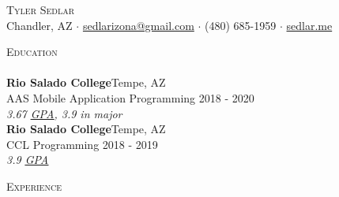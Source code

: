 \documentclass[a4paper]{article}
\newcommand{\lineunder} {
    \vspace*{-8pt} \\
    \hspace*{-18pt} \hrulefill \\
}
\newcommand{\header} [1] {
    {\hspace*{-18pt}\vspace*{6pt} \textsc{#1}}
    \vspace*{-6pt} \lineunder
}
\begin{document}
\vspace*{-40pt}
\setul{}{0.25pt}

\vspace*{-10pt}
\begin{center}
	{\Huge \scshape {Tyler Sedlar}}\\
	Chandler, AZ $\cdot$ \href{mailto:sedlarizona@gmail.com}{sedlarizona@gmail.com} $\cdot$ (480) 685-1959 $\cdot$ \href{https://sedlar.me/}{sedlar.me}\\
\end{center}

\header{Education}
\textbf{Rio Salado College}\hfill Tempe, AZ\\
AAS Mobile Application Programming \hfill 2018 - 2020\\
\textit{3.67 \href{https://docs.google.com/spreadsheets/d/143DmVdsyjRVbH1ftcySxflvuNjioncAvJpj0vFbzpA8/edit?usp=sharing}{\ul{GPA}}, 3.9 in major}\\
\vspace{2mm}
\textbf{Rio Salado College}\hfill Tempe, AZ\\
CCL Programming \hfill 2018 - 2019\\
\textit{3.9 \href{https://docs.google.com/spreadsheets/d/143DmVdsyjRVbH1ftcySxflvuNjioncAvJpj0vFbzpA8/edit?usp=sharing}{\ul{GPA}}}\\
\vspace{2mm}

\header{Experience}
\vspace{1mm}
\end{document}
